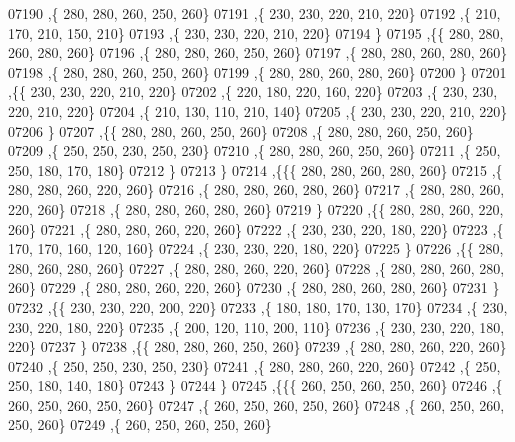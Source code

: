 \begin{DoxyCode}
07190     ,\{   280,   280,   260,   250,   260\}
07191     ,\{   230,   230,   220,   210,   220\}
07192     ,\{   210,   170,   210,   150,   210\}
07193     ,\{   230,   230,   220,   210,   220\}
07194     \}
07195    ,\{\{   280,   280,   260,   280,   260\}
07196     ,\{   280,   280,   260,   250,   260\}
07197     ,\{   280,   280,   260,   280,   260\}
07198     ,\{   280,   280,   260,   250,   260\}
07199     ,\{   280,   280,   260,   280,   260\}
07200     \}
07201    ,\{\{   230,   230,   220,   210,   220\}
07202     ,\{   220,   180,   220,   160,   220\}
07203     ,\{   230,   230,   220,   210,   220\}
07204     ,\{   210,   130,   110,   210,   140\}
07205     ,\{   230,   230,   220,   210,   220\}
07206     \}
07207    ,\{\{   280,   280,   260,   250,   260\}
07208     ,\{   280,   280,   260,   250,   260\}
07209     ,\{   250,   250,   230,   250,   230\}
07210     ,\{   280,   280,   260,   250,   260\}
07211     ,\{   250,   250,   180,   170,   180\}
07212     \}
07213    \}
07214   ,\{\{\{   280,   280,   260,   280,   260\}
07215     ,\{   280,   280,   260,   220,   260\}
07216     ,\{   280,   280,   260,   280,   260\}
07217     ,\{   280,   280,   260,   220,   260\}
07218     ,\{   280,   280,   260,   280,   260\}
07219     \}
07220    ,\{\{   280,   280,   260,   220,   260\}
07221     ,\{   280,   280,   260,   220,   260\}
07222     ,\{   230,   230,   220,   180,   220\}
07223     ,\{   170,   170,   160,   120,   160\}
07224     ,\{   230,   230,   220,   180,   220\}
07225     \}
07226    ,\{\{   280,   280,   260,   280,   260\}
07227     ,\{   280,   280,   260,   220,   260\}
07228     ,\{   280,   280,   260,   280,   260\}
07229     ,\{   280,   280,   260,   220,   260\}
07230     ,\{   280,   280,   260,   280,   260\}
07231     \}
07232    ,\{\{   230,   230,   220,   200,   220\}
07233     ,\{   180,   180,   170,   130,   170\}
07234     ,\{   230,   230,   220,   180,   220\}
07235     ,\{   200,   120,   110,   200,   110\}
07236     ,\{   230,   230,   220,   180,   220\}
07237     \}
07238    ,\{\{   280,   280,   260,   250,   260\}
07239     ,\{   280,   280,   260,   220,   260\}
07240     ,\{   250,   250,   230,   250,   230\}
07241     ,\{   280,   280,   260,   220,   260\}
07242     ,\{   250,   250,   180,   140,   180\}
07243     \}
07244    \}
07245   ,\{\{\{   260,   250,   260,   250,   260\}
07246     ,\{   260,   250,   260,   250,   260\}
07247     ,\{   260,   250,   260,   250,   260\}
07248     ,\{   260,   250,   260,   250,   260\}
07249     ,\{   260,   250,   260,   250,   260\}

\end{DoxyCode}
